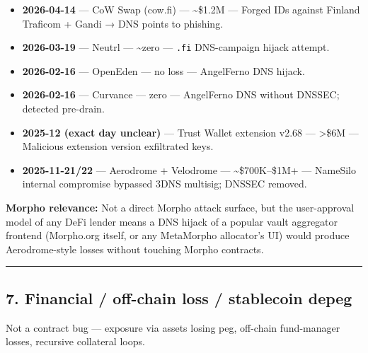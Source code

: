 \begin{itemize}
\tightlist
\item
  \textbf{2026-04-14} --- CoW Swap (cow.fi) --- \textasciitilde\$1.2M --- Forged IDs against Finland Traficom + Gandi → DNS points to phishing.
\item
  \textbf{2026-03-19} --- Neutrl --- \textasciitilde zero --- \texttt{.fi} DNS-campaign hijack attempt.
\item
  \textbf{2026-02-16} --- OpenEden --- no loss --- AngelFerno DNS hijack.
\item
  \textbf{2026-02-16} --- Curvance --- zero --- AngelFerno DNS without DNSSEC; detected pre-drain.
\item
  \textbf{2025-12 (exact day unclear)} --- Trust Wallet extension v2.68 --- \textgreater\$6M --- Malicious extension version exfiltrated keys.
\item
  \textbf{2025-11-21/22} --- Aerodrome + Velodrome --- \textasciitilde\$700K--\$1M+ --- NameSilo internal compromise bypassed 3DNS multisig; DNSSEC removed.
\end{itemize}

\textbf{Morpho relevance:} Not a direct Morpho attack surface, but the user-approval model of any DeFi lender means a DNS hijack of a popular vault aggregator frontend (Morpho.org itself, or any MetaMorpho allocator's UI) would produce Aerodrome-style losses without touching Morpho contracts.

\begin{center}\rule{0.5\linewidth}{0.5pt}\end{center}

\subsection{7. Financial / off-chain loss / stablecoin depeg}\label{financial-off-chain-loss-stablecoin-depeg}

Not a contract bug --- exposure via assets losing peg, off-chain fund-manager losses, recursive collateral loops.


